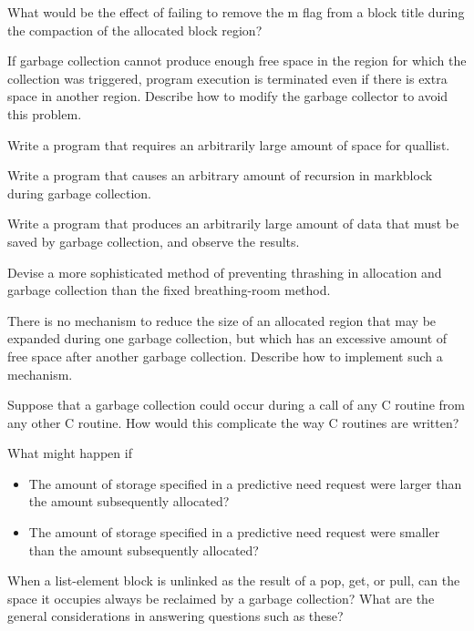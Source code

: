  What would be the effect of failing to remove
the m flag from a block title during the compaction of the allocated
block region?

 If garbage collection cannot produce enough free
space in the region for which the collection was triggered, program
execution is terminated even if there is extra space in another
region. Describe how to modify the garbage collector to avoid this
problem.

 Write a program that requires an arbitrarily
large amount of space for quallist.

 Write a program that causes an arbitrary amount
of recursion in markblock during garbage collection.

 Write a program that produces an arbitrarily
large amount of data that must be saved by garbage collection, and
observe the results.

 Devise a more sophisticated method of preventing
thrashing in allocation and garbage collection than the fixed
breathing-room method.

 There is no mechanism to reduce the size of an
allocated region that may be expanded during one garbage collection,
but which has an excessive amount of free space after another garbage
collection. Describe how to implement such a mechanism.

 Suppose that a garbage collection could occur
during a call of any C routine from any other C routine. How would
this complicate the way C routines are written?

 What might happen if

\begin{itemize}

\item The amount of storage specified in a predictive need request
were larger than the amount subsequently allocated?

\item The amount of storage specified in a predictive need request
were smaller than the amount subsequently allocated?

\end{itemize}

 When a list-element block is unlinked as the
result of a pop, get, or pull, can the space it occupies always be
reclaimed by a garbage collection? What are the general considerations
in answering questions such as these?


